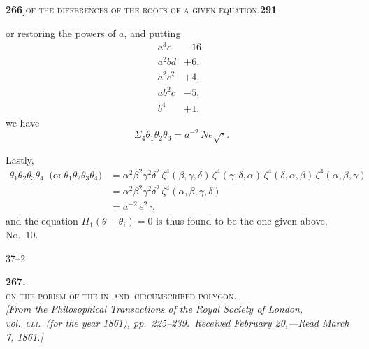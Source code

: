 \documentclass[11pt]{article}
\begin{document}
\newpage
\setcounter{page}{291}

\noindent\textbf{266]}\hfill\textsc{of the differences of the roots of a given equation.}\hfill\textbf{291}

\medskip

\noindent or restoring the powers of $a$, and putting
\[
\begin{array}{rr}
a^3 e       & -16,\\
a^2 b d     & +6,\\
a^2 c^2     & +4,\\
a b^2 c     & -5,\\
b^4         & +1,
\end{array}
\]
we have
\[
   \Sigma_4\theta_1\theta_2\theta_3 = a^{-2}\,N e\sqrt{\square}.
\]

\medskip

\noindent Lastly,
\[
\begin{aligned}
   \theta_1\theta_2\theta_3\theta_4 \;\;\bigl(\text{or}\ \theta_1\theta_2\theta_3\theta_4\bigr)
   &= \alpha^2\beta^2\gamma^2\delta^2\,\zeta^4(\beta, \gamma, \delta)\,\zeta^4(\gamma, \delta, \alpha)\,\zeta^4(\delta, \alpha, \beta)\,\zeta^4(\alpha, \beta, \gamma)\\
   &= \alpha^2\beta^2\gamma^2\delta^2\,\zeta^4(\alpha, \beta, \gamma, \delta)\\
   &= a^{-2}\,e^2\,\square,
\end{aligned}
\]
and the equation $\Pi_1(\theta - \theta_i) = 0$ is thus found to be the one given above, No.~10.

\medskip

\hfill 37--2

\newpage
\setcounter{page}{292}


\begin{center}
\textbf{267.}\\[0.6em]
\textsc{on the porism of the in--and--circumscribed polygon.}\\[0.4em]
\textit{[From the Philosophical Transactions of the Royal Society of London, vol.~\textsc{cli.}\ (for the year 1861), pp.~225--239.\ Received February 20,---Read March 7, 1861.]}
\end{center}

\medskip
\end{document}
